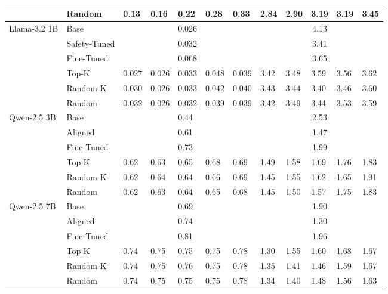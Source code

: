 \documentclass[10pt]{article}
\begin{document}
\begin{table}[h]
\begin{center}
\begin{tabular}{|l|l|l|l|l|l|l|l|l|l|l|l|}
\hline
 & Random & 0.13 & 0.16 & 0.22 & 0.28 & 0.33 & 2.84 & 2.90 & 3.19 & 3.19 & 3.45 \\
\hline
\multirow{6}{*}{Llama-3.2 1B} & Base & \multicolumn{5}{|c|}{0.026} & \multicolumn{5}{|c|}{4.13} \\
\hline
 & Safety-Tuned & \multicolumn{5}{|c|}{0.032} & \multicolumn{5}{|c|}{3.41} \\
\hline
 & Fine-Tuned & \multicolumn{5}{|c|}{0.068} & \multicolumn{5}{|c|}{3.65} \\
\hline
 & Top-K & 0.027 & 0.026 & 0.033 & 0.048 & 0.039 & 3.42 & 3.48 & 3.59 & 3.56 & 3.62 \\
\hline
 & Random-K & 0.030 & 0.026 & 0.033 & 0.042 & 0.040 & 3.43 & 3.44 & 3.40 & 3.46 & 3.60 \\
\hline
 & Random & 0.032 & 0.026 & 0.032 & 0.039 & 0.039 & 3.42 & 3.49 & 3.44 & 3.53 & 3.59 \\
\hline
\multirow{6}{*}{Qwen-2.5 3B} & Base & \multicolumn{2}{|c|}{} & 0.44 & \multicolumn{2}{|c|}{} & \multicolumn{5}{|c|}{2.53} \\
\hline
 & Aligned & \multicolumn{2}{|c|}{} & 0.61 & \multicolumn{2}{|c|}{\multirow{2}{*}{}} & \multicolumn{5}{|c|}{1.47} \\
\hline
 & Fine-Tuned & \multicolumn{2}{|c|}{} & 0.73 &  &  & \multicolumn{5}{|c|}{1.99} \\
\hline
 & Top-K & 0.62 & 0.63 & 0.65 & 0.68 & 0.69 & 1.49 & 1.58 & 1.69 & 1.76 & 1.83 \\
\hline
 & Random-K & 0.62 & 0.64 & 0.64 & 0.66 & 0.69 & 1.45 & 1.55 & 1.62 & 1.65 & 1.91 \\
\hline
 & Random & 0.62 & 0.63 & 0.64 & 0.65 & 0.68 & 1.45 & 1.50 & 1.57 & 1.75 & 1.83 \\
\hline
\multirow{6}{*}{Qwen-2.5 7B} & Base & \multicolumn{2}{|c|}{} & 0.69 & \multicolumn{2}{|c|}{} & \multicolumn{5}{|c|}{1.90} \\
\hline
 & Aligned & \multicolumn{2}{|c|}{} & 0.74 & \multicolumn{2}{|c|}{\multirow{2}{*}{}} & \multicolumn{5}{|c|}{1.30} \\
\hline
 & Fine-Tuned & \multicolumn{2}{|c|}{} & 0.81 &  &  & \multicolumn{5}{|c|}{1.96} \\
\hline
 & Top-K & 0.74 & 0.75 & 0.75 & 0.75 & 0.78 & 1.30 & 1.55 & 1.60 & 1.68 & 1.67 \\
\hline
 & Random-K & 0.74 & 0.75 & 0.76 & 0.75 & 0.78 & 1.35 & 1.41 & 1.46 & 1.59 & 1.67 \\
\hline
 & Random & 0.74 & 0.75 & 0.75 & 0.75 & 0.78 & 1.34 & 1.40 & 1.48 & 1.56 & 1.63 \\

\end{tabular}
\end{center}
\end{table}
\end{document}
